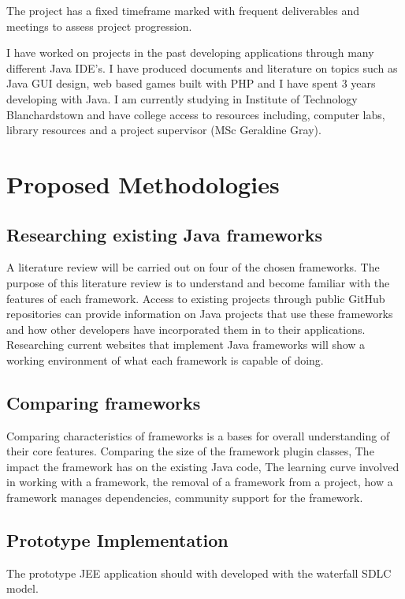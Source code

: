 The project has a fixed timeframe marked with frequent deliverables and meetings to assess project progression.

I have worked on projects in the past developing applications through many different Java IDE's. I have produced documents and literature on topics such as Java GUI design, web based games built with PHP and I have spent 3 years developing with Java. I am currently studying in Institute of Technology Blanchardstown and have college access to resources including, computer labs, library resources and a project supervisor (MSc Geraldine Gray).

\section{Proposed Methodologies}
\subsection{Researching existing Java frameworks}
A literature review will be carried out on four of the chosen frameworks. The purpose of this literature review is to understand and become familiar with the features of each framework. Access to existing projects through public GitHub repositories can provide information on Java projects that use these frameworks and how other developers have incorporated them in to their applications. Researching current websites that implement Java frameworks will show a working environment of what each framework is capable of doing.


\subsection{Comparing frameworks}
Comparing characteristics of frameworks is a bases for overall understanding of their core features. Comparing the size of the framework plugin classes, The impact the framework has on the existing Java code, The learning curve involved in working with a framework, the removal of a framework from a project, how a framework manages dependencies, community support for the framework.

\newpage	

\subsection{Prototype Implementation}
The prototype JEE application should with developed with the waterfall SDLC model. 

